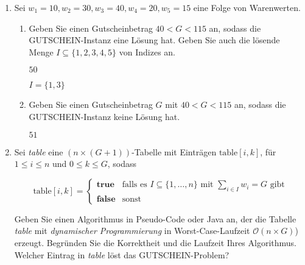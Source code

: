\documentclass{bschlangaul-aufgabe}
\begin{document}
\begin{enumerate}


\item Sei $w_1 = 10, w_2 = 30, w_3 = 40, w_4 = 20, w_5 = 15$ eine Folge
von Warenwerten.

\begin{enumerate}


\item Geben Sie einen Gutscheinbetrag $40 < G < 115$ an, sodass die
GUT\-SCHEIN-Instanz eine Lösung hat. Geben Sie auch die lösende Menge $I
\subseteq \{ 1, 2, 3, 4, 5 \}$ von Indizes an.

\begin{liAntwort}
$50$

$I = \{ 1, 3 \}$
\end{liAntwort}


\item Geben Sie einen Gutscheinbetrag $G$ mit $40 < G < 115$ an, sodass
die GUTSCHEIN-Instanz keine Lösung hat.

\begin{liAntwort}
$51$
\end{liAntwort}

\end{enumerate}


\item Sei \emph{table} eine $(n \times (G + 1))$-Tabelle mit Einträgen
$\text{table}[i,k]$, für $1 \leq i \leq n$ und $0 \leq k \leq G$, sodass

\begin{equation*}
\text{table}[i,k] =
\begin{cases}
\textbf{true} &
\text{falls es } I \subseteq \{1, \dots, n \} \text{ mit }
\sum_{i \in I} w_i = G \text{ gibt}\\

\textbf{false} & \text{sonst}
\end{cases}
\end{equation*}

Geben Sie einen Algorithmus in Pseudo-Code oder Java an, der die Tabelle
\emph{table} mit \emph{dynamischer Programmierung} in
Worst-Case-Laufzeit $\mathcal{O}(n \times G)$) erzeugt. Begründen Sie
die Korrektheit und die Laufzeit Ihres Algorithmus. Welcher Eintrag in
\emph{table} löst das GUTSCHEIN-Problem?

\begin{liAntwort}
\begin{algorithm}[H]
\newcommand{\meinkommentar}[1]{\texttt{\scriptsize #1}}


\end{algorithm}
\end{liAntwort}
\end{enumerate}
\end{document}
